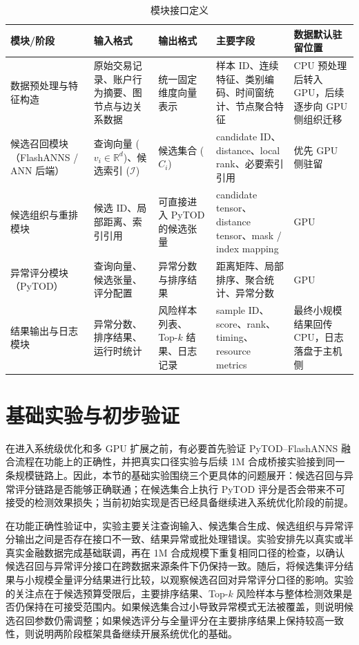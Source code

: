 \begin{table}[htbp]
  \caption{模块接口定义}
  \label{tab:module-interfaces}
  \centering
  \small
  \renewcommand{\arraystretch}{1.2}
  \begin{adjustbox}{max width=\linewidth}
  \begin{tabular}{P{3.4cm}P{4.2cm}P{2.8cm}P{4.6cm}P{3.2cm}}
    \toprule
    模块/阶段 & 输入格式 & 输出格式 & 主要字段 & 数据默认驻留位置\\
    \midrule
    数据预处理与特征构造 & 原始交易记录、账户行为摘要、图节点与边关系数据 & 统一固定维度向量表示 & 样本 ID、连续特征、类别编码、时间窗统计、节点聚合特征 & CPU 预处理后转入 GPU，后续逐步向 GPU 侧组织迁移\\
    候选召回模块（FlashANNS / ANN 后端） & 查询向量 ($v_i\in\mathbb{R}^d$)、候选索引 ($\mathcal{I}$) & 候选集合 ($C_i$) & candidate ID、distance、local rank、必要索引引用 & 优先 GPU 侧驻留\\
    候选组织与重排模块 & 候选 ID、局部距离、索引引用 & 可直接进入 PyTOD 的候选张量 & candidate tensor、distance tensor、mask / index mapping & GPU\\
    异常评分模块（PyTOD） & 查询向量、候选张量、评分配置 & 异常分数与排序结果 & 距离矩阵、局部排序、聚合统计、异常分数 & GPU\\
    结果输出与日志模块 & 异常分数、排序结果、运行时统计 & 风险样本列表、Top-$k$ 结果、日志记录 & sample ID、score、rank、timing、resource metrics & 最终小规模结果回传 CPU，日志落盘于主机侧\\
    \bottomrule
  \end{tabular}
  \end{adjustbox}
\end{table}

\FloatBarrier

\section{基础实验与初步验证}

在进入系统级优化和多 GPU 扩展之前，有必要首先验证 PyTOD--FlashANNS 融合流程在功能上的正确性，并把真实口径实验与后续 1M 合成桥接实验接到同一条规模链路上。因此，本节的基础实验围绕三个更具体的问题展开：候选召回与异常评分链路是否能够正确联通；在候选集合上执行 PyTOD 评分是否会带来不可接受的检测效果损失；当前初始实现是否已经具备继续进入系统优化阶段的前提。

在功能正确性验证中，实验主要关注查询输入、候选集合生成、候选组织与异常评分输出之间是否存在接口不一致、结果异常或批处理错误。实验安排先以真实或半真实金融数据完成基础联调，再在 1M 合成规模下重复相同口径的检查，以确认候选召回与异常评分接口在跨数据来源条件下仍保持一致。随后，将候选集评分结果与小规模全量评分结果进行比较，以观察候选召回对异常评分口径的影响。实验的关注点在于候选预算受限后，主要排序结果、Top-$k$ 风险样本与整体检测效果是否仍保持在可接受范围内。如果候选集合过小导致异常模式无法被覆盖，则说明候选召回参数仍需调整；如果候选评分与全量评分在主要排序结果上保持较高一致性，则说明两阶段框架具备继续开展系统优化的基础。

